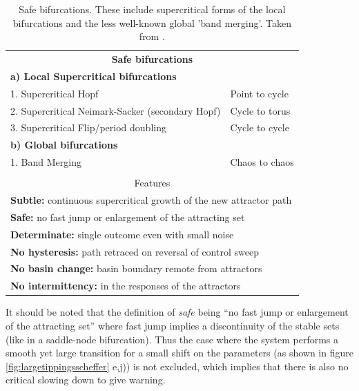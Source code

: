 \begin{table}[H]
			\centering
		\begin{tabular}{ll}
			\hline
			\multicolumn{2}{c}{\textbf{Safe bifurcations}} \\
			\textbf{a) Local Supercritical bifurcations} & \\
				1. Supercritical Hopf & Point to cycle\\
				2. Supercritical Neimark-Sacker (secondary Hopf) & Cycle to torus \\				
				3. Supercritical Flip/period doubling & Cycle to cycle \\			
			\textbf{b) Global bifurcations} & \\
				1. Band Merging & Chaos to chaos\\
	& \\
		\multicolumn{2}{c}{Features}	\\
		\multicolumn{2}{l}{\textbf{Subtle:} continuous supercritical growth of the new attractor path}\\
		\multicolumn{2}{l}{	\textbf{Safe:} no fast jump or enlargement of the attracting set }	\\
		\multicolumn{2}{l}{	\textbf{Determinate:} single outcome even with small noise}	\\
		\multicolumn{2}{l}{	\textbf{No hysteresis:} path retraced on reversal of control sweep}	\\
		\multicolumn{2}{l}{	\textbf{No basin change:} basin boundary remote from attractors}\\
		\multicolumn{2}{l}{	\textbf{No intermittency:} in the responses of the attractors}	\\   
	\hline
			\end{tabular}
			\caption{Safe bifurcations. These include supercritical forms of the local bifurcations and the less well-known global 'band merging'. Taken from \cite{Thompson2011a}.  }
			\label{tab:safe_bifs}
\end{table}

It should be noted that the definition of \textit{safe} being ``no fast jump or enlargement of the attracting set'' where fast jump implies a discontinuity of the stable sets (like in a saddle-node bifurcation). Thus the case where the system performs a smooth yet large transition for a small shift on the parameters (as shown in figure \ref{fig:largetippingsscheffer} e,j)) is not excluded, which implies that there is also no critical slowing down to give warning. 






